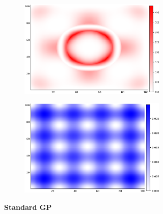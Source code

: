 \documentclass{article}
\numberwithin{equation}{section}
\begin{document}
\begin{figure}
		\centering
		\captionsetup{justification=centering}
    \begin{subfigure}[b]{.5\textwidth}
      \centering
      \begin{subfigure}[b]{.5\textwidth}
        \includegraphics[scale=0.27]{figures/heatmaps/error-noder-25.png}
      \end{subfigure}%
      \begin{subfigure}[b]{.5\textwidth}
        \includegraphics[scale=0.27]{figures/heatmaps/variance-noder-25.png}
      \end{subfigure}
      \caption{\textbf{Standard GP}}
    \end{subfigure}%
    \begin{subfigure}[b]{.5\textwidth}
      \centering
      \begin{subfigure}[b]{.5\textwidth}
        \centering

\end{subfigure}
\end{subfigure}
\end{figure}
\end{document}
